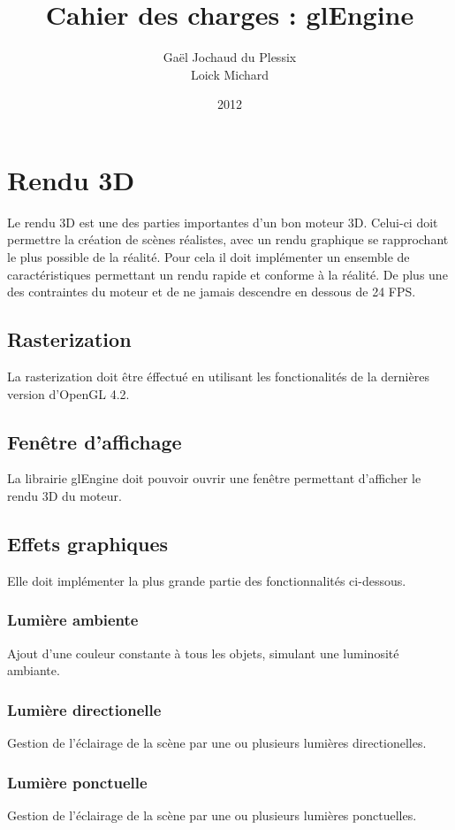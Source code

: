 \documentclass [a4 paper,11pt]{article}
\title {Cahier des charges : glEngine}
\author {Gaël Jochaud du Plessix\\
Loick Michard}
\date {2012}
\begin{document}
\maketitle

\section{Rendu 3D}

Le rendu 3D est une des parties importantes d'un bon moteur 3D.
Celui-ci doit permettre la création de scènes réalistes, avec un rendu graphique se rapprochant le plus possible de la réalité.
Pour cela il doit implémenter un ensemble de caractéristiques permettant un rendu rapide et conforme à la réalité.
De plus une des contraintes du moteur et de ne jamais descendre en dessous de 24 FPS.

\subsection{Rasterization}
La rasterization doit être éffectué en utilisant les fonctionalités de la dernières version d'OpenGL 4.2.

\subsection{Fenêtre d'affichage}
La librairie glEngine doit pouvoir ouvrir une fenêtre permettant d'afficher le rendu 3D du moteur.

\subsection{Effets graphiques}

Elle doit implémenter la plus grande partie des fonctionnalités ci-dessous.

\subsubsection*{Lumière ambiente}
Ajout d'une couleur constante à tous les objets, simulant une luminosité ambiante.
\subsubsection*{Lumière directionelle}
Gestion de l'éclairage de la scène par une ou plusieurs lumières directionelles.
\subsubsection*{Lumière ponctuelle}
Gestion de l'éclairage de la scène par une ou plusieurs lumières ponctuelles.
\end{document}
